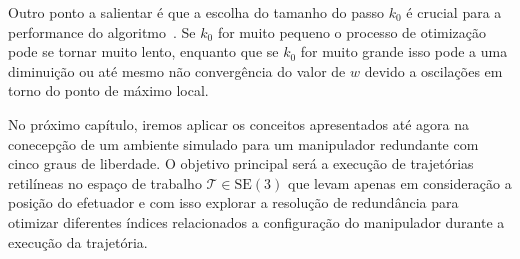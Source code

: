 Outro ponto a salientar é que a escolha do tamanho do passo \(k_0\) é crucial
para a performance do algoritmo~\cite{siciliano_springer_2008}. Se \(k_0\) 
for muito pequeno o processo de otimização pode se tornar muito lento, enquanto 
que se \(k_0\) for muito grande isso pode a uma diminuição ou até
 mesmo não convergência do valor de \(w\) devido a oscilações em torno do ponto 
 de máximo local.

No próximo capítulo, iremos aplicar os conceitos apresentados até agora na
conecepção de um ambiente simulado para um manipulador redundante com cinco
graus de liberdade. O objetivo principal será a execução de trajetórias
retilíneas no espaço de trabalho \(\mathcal{T} \in \text{SE}(3)\) que levam
apenas em consideração a posição do efetuador e com isso explorar a resolução
de redundância para otimizar diferentes índices relacionados a configuração do
manipulador durante a execução da trajetória.
